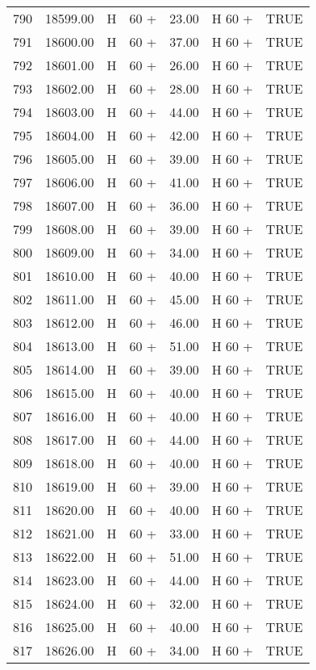 \begin{table}[ht]
\begin{tabular}{rrllrll}
  790 & 18599.00 & H & 60 + & 23.00 & H 60 + & TRUE \\ 
  791 & 18600.00 & H & 60 + & 37.00 & H 60 + & TRUE \\ 
  792 & 18601.00 & H & 60 + & 26.00 & H 60 + & TRUE \\ 
  793 & 18602.00 & H & 60 + & 28.00 & H 60 + & TRUE \\ 
  794 & 18603.00 & H & 60 + & 44.00 & H 60 + & TRUE \\ 
  795 & 18604.00 & H & 60 + & 42.00 & H 60 + & TRUE \\ 
  796 & 18605.00 & H & 60 + & 39.00 & H 60 + & TRUE \\ 
  797 & 18606.00 & H & 60 + & 41.00 & H 60 + & TRUE \\ 
  798 & 18607.00 & H & 60 + & 36.00 & H 60 + & TRUE \\ 
  799 & 18608.00 & H & 60 + & 39.00 & H 60 + & TRUE \\ 
  800 & 18609.00 & H & 60 + & 34.00 & H 60 + & TRUE \\ 
  801 & 18610.00 & H & 60 + & 40.00 & H 60 + & TRUE \\ 
  802 & 18611.00 & H & 60 + & 45.00 & H 60 + & TRUE \\ 
  803 & 18612.00 & H & 60 + & 46.00 & H 60 + & TRUE \\ 
  804 & 18613.00 & H & 60 + & 51.00 & H 60 + & TRUE \\ 
  805 & 18614.00 & H & 60 + & 39.00 & H 60 + & TRUE \\ 
  806 & 18615.00 & H & 60 + & 40.00 & H 60 + & TRUE \\ 
  807 & 18616.00 & H & 60 + & 40.00 & H 60 + & TRUE \\ 
  808 & 18617.00 & H & 60 + & 44.00 & H 60 + & TRUE \\ 
  809 & 18618.00 & H & 60 + & 40.00 & H 60 + & TRUE \\ 
  810 & 18619.00 & H & 60 + & 39.00 & H 60 + & TRUE \\ 
  811 & 18620.00 & H & 60 + & 40.00 & H 60 + & TRUE \\ 
  812 & 18621.00 & H & 60 + & 33.00 & H 60 + & TRUE \\ 
  813 & 18622.00 & H & 60 + & 51.00 & H 60 + & TRUE \\ 
  814 & 18623.00 & H & 60 + & 44.00 & H 60 + & TRUE \\ 
  815 & 18624.00 & H & 60 + & 32.00 & H 60 + & TRUE \\ 
  816 & 18625.00 & H & 60 + & 40.00 & H 60 + & TRUE \\ 
  817 & 18626.00 & H & 60 + & 34.00 & H 60 + & TRUE \\ 

\end{tabular}
\end{table}
